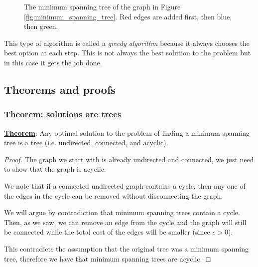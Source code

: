 \documentclass[12pt]{extarticle}
\begin{document}
\begin{figure}[H]
    \centering
    \caption{The minimum spanning tree of the graph in Figure \ref{fig:minimum_spanning_tree}. Red edges are added first, then blue, then green.}
    \label{fig:minimum_spanning_tree_kruskal}
\end{figure}

This type of algorithm is called a \textit{greedy algorithm} because it always chooses the best option at each step.
This is not always the best solution to the problem but in this case it gets the job done.

\subsection{Theorems and proofs}

\subsubsection{Theorem: solutions are trees}

\textbf{\underline{Theorem}}: Any optimal solution to the problem of finding a minimum spanning tree is a tree (i.e. undirected, connected, and acyclic).

\begin{proof}
    The graph we start with is already undirected and connected, we just need to show that the graph is acyclic.

    We note that if a connected undirected graph contains a cycle, then any one of the edges in the cycle can be removed without disconnecting the graph.

    We will argue by contradiction that minimum spanning trees contain a cycle. Then, as we saw, we can remove an edge from the cycle and the graph will still be connected while the total cost of the edges will be smaller (since $c > 0$).

    This contradicts the assumption that the original tree was a minimum spanning tree, therefore we have that minimum spanning trees are acyclic.
\end{proof}
\end{document}
